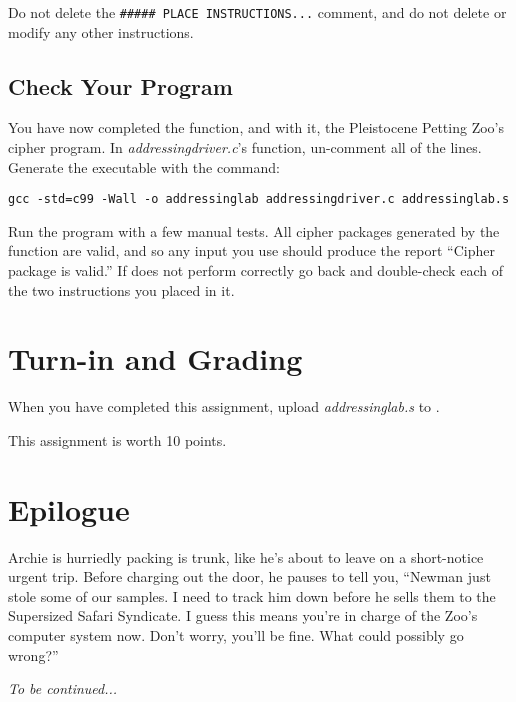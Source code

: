 
Do not delete the \texttt{\#\#\#\#\# PLACE INSTRUCTIONS...} comment, and do not
delete or modify any other instructions.

\subsection*{Check Your Program}

You have now completed the  function, and with it,
the Pleistocene Petting Zoo's cipher program. In \textit{addressingdriver.c}'s
 function, un-comment all of the lines. Generate the executable
with the command:

\texttt{gcc -std=c99 -Wall -o addressinglab addressingdriver.c addressinglab.s}

Run the program with a few manual tests. All cipher packages generated by the
 function are valid, and so any input you use should produce the
report ``Cipher package is valid.'' If  does not
perform correctly go back and double-check each of the two instructions you
placed in it.


\section*{Turn-in and Grading}

When you have completed this assignment, upload \textit{addressinglab.s} to
\filesubmission.

This assignment is worth 10 points. \\

\begin{description}
\end{description}

\section*{Epilogue}

Archie is hurriedly packing is trunk, like he's about to leave on a
short-notice urgent trip. Before charging out the door, he pauses to tell you,
``Newman just stole some of our samples. I need to track him down before he
sells them to the Supersized Safari Syndicate. I guess this means you're in
charge of the Zoo's computer system now. Don't worry, you'll be fine. What
could possibly go wrong?''

\textit{To be continued...}


